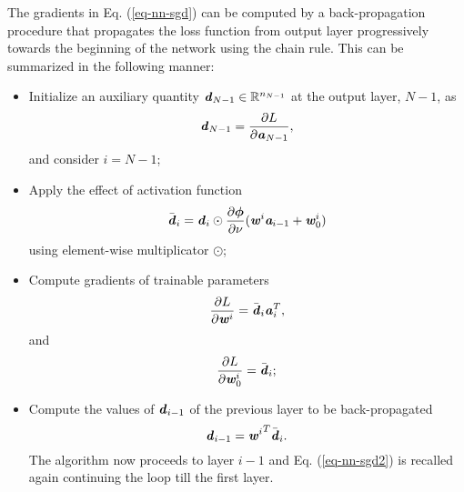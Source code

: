 The gradients in Eq. (\ref{eq-nn-sgd}) can be computed by a back-propagation procedure that propagates the loss function from output layer progressively towards the beginning of the network using the chain rule. This can be summarized in the following manner:
\begin{itemize}
	\item Initialize an auxiliary quantity $ \textbf{\textit{d}}_{N-1}\in\mathbb{R}^{n_{N-1}} $ at the output layer, $ N-1 $, as
	\begin{equation}\label{eq-nn-sgd1}
	\textbf{\textit{d}}_{N-1}=\frac{\partial L}{\partial\textbf{\textit{a}}_{N-1}},
	\end{equation}
	and consider $ i=N-1 $;
	\item Apply the effect of activation function
	\begin{equation}\label{eq-nn-sgd2}
	\bar{\textbf{\textit{d}}}_i=\textbf{\textit{d}}_i\odot\frac{\partial\bm\phi}{\partial\nu}(\textbf{\textit{w}}^i\textit{\textbf{a}}_{i-1}+\textbf{\textit{w}}^i_0)
	\end{equation}
	using element-wise multiplicator $ \odot $;
	\item Compute gradients of trainable parameters
	\begin{equation}\label{eq-nn-sgd3}
		\frac{\partial L}{\partial\textbf{\textit{w}}^i} = \bar{\textbf{\textit{d}}}_i\textbf{\textit{a}}_i^T,
	\end{equation}
	and
	\begin{equation}
		\frac{\partial L}{\partial\textbf{\textit{w}}^i_0} = \bar{\textbf{\textit{d}}}_i;
	\end{equation}
	\item Compute the values of $ \textbf{\textit{d}}_{i-1} $ of the previous layer to be back-propagated
	\begin{equation}\label{eq-nn-sgd4}
	\textbf{\textit{d}}_{i-1}={\textbf{\textit{w}}^i}^T\bar{\textbf{\textit{d}}}_i.
	\end{equation}
	The algorithm now proceeds to layer $ i-1 $ and Eq. (\ref{eq-nn-sgd2}) is recalled again continuing the loop till the first layer.
\end{itemize}

